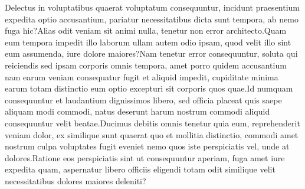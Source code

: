 \documentclass[letterpaper]{article} %
\begin{document}


Delectus in voluptatibus quaerat voluptatum consequuntur, incidunt praesentium expedita optio accusantium, pariatur necessitatibus dicta sunt tempora, ab nemo fuga hic?Alias odit veniam sit animi nulla, tenetur non error architecto.Quam eum tempora impedit illo laborum ullam autem odio ipsam, quod velit illo sint eum assumenda, iure dolore maiores?Nam tenetur error consequuntur, soluta qui reiciendis sed ipsam corporis omnis tempora, amet porro quidem accusantium nam earum veniam consequatur fugit et aliquid impedit, cupiditate minima earum totam distinctio eum optio excepturi sit corporis quos quae.Id numquam consequuntur et laudantium dignissimos libero, sed officia placeat quis saepe aliquam modi commodi, natus deserunt harum nostrum commodi aliquid consequuntur velit beatae.Ducimus debitis omnis tenetur quia eum, reprehenderit veniam dolor, ex similique sunt quaerat quo et mollitia distinctio, commodi amet nostrum culpa voluptates fugit eveniet nemo quos iste perspiciatis vel, unde at dolores.Ratione eos perspiciatis sint ut consequuntur aperiam, fuga amet iure expedita quam, aspernatur libero officiis eligendi totam odit similique velit necessitatibus dolores maiores deleniti?\clearpage


% 
\end{document}
